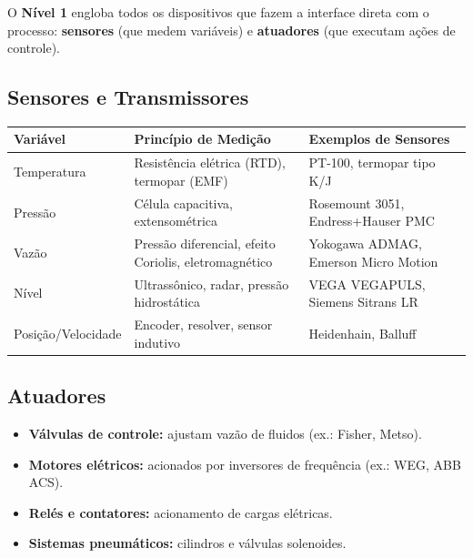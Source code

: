O \textbf{Nível 1} engloba todos os dispositivos que fazem a interface direta com o processo: \textbf{sensores} (que medem variáveis) e \textbf{atuadores} (que executam ações de controle).

\subsection{Sensores e Transmissores}\label{sensores-e-transmissores}

\begin{longtable}[]{@{}
  >{\raggedright\arraybackslash}p{}
  >{\raggedright\arraybackslash}p{}
  >{\raggedright\arraybackslash}p{}@{}}
\toprule\noalign{}
\begin{minipage}[b]{\linewidth}\raggedright
Variável
\end{minipage} & \begin{minipage}[b]{\linewidth}\raggedright
Princípio de Medição
\end{minipage} & \begin{minipage}[b]{\linewidth}\raggedright
Exemplos de Sensores
\end{minipage} \\
\midrule\noalign{}
\endhead
\bottomrule\noalign{}
\endlastfoot
Temperatura & Resistência elétrica (RTD), termopar (EMF) & PT-100, termopar tipo K/J \\
Pressão & Célula capacitiva, extensométrica & Rosemount 3051, Endress+Hauser PMC \\
Vazão & Pressão diferencial, efeito Coriolis, eletromagnético & Yokogawa ADMAG, Emerson Micro Motion \\
Nível & Ultrassônico, radar, pressão hidrostática & VEGA VEGAPULS, Siemens Sitrans LR \\
Posição/Velocidade & Encoder, resolver, sensor indutivo & Heidenhain, Balluff \\
\end{longtable}

\subsection{Atuadores}\label{atuadores}

\begin{itemize}
\tightlist
\item
  \textbf{Válvulas de controle:} ajustam vazão de fluidos (ex.: Fisher, Metso).
\item
  \textbf{Motores elétricos:} acionados por inversores de frequência (ex.: WEG, ABB ACS).
\item
  \textbf{Relés e contatores:} acionamento de cargas elétricas.
\item
  \textbf{Sistemas pneumáticos:} cilindros e válvulas solenoides.
\end{itemize}

